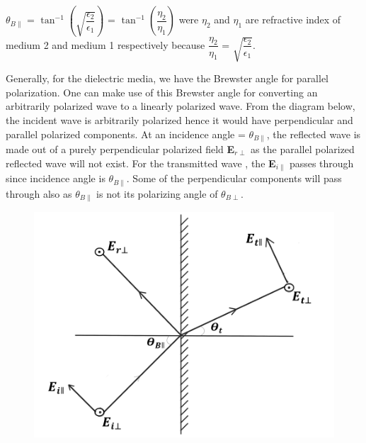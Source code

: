  $\theta_{B\parallel}$ = $\tan^{-1}\left(\sqrt{\dfrac{\epsilon_2}{\epsilon_1}}\right)$ = $\tan^{-1}\left(\dfrac{\eta_2}{\eta_1}\right)$ were $\eta_2$ and $\eta_1$ are refractive index of medium 2 and medium 1 respectively because $\dfrac{\eta_2}{\eta_1}$ = $\sqrt{\dfrac{\epsilon_2}{\epsilon_1}}$.

Generally, for the dielectric media, we have the Brewster angle for parallel polarization. One can make use of this Brewster angle for converting an arbitrarily polarized wave to a linearly polarized wave. From the diagram below, the incident wave is arbitrarily polarized hence it would have perpendicular and parallel polarized components. At an incidence angle = $\theta_{B\parallel}$, the reflected wave is made out of a purely perpendicular polarized field \textbf{E}$_{r\perp}$ as the parallel polarized reflected wave will not exist. For the transmitted wave , the \textbf{E}$_{i\parallel}$ passes through since incidence angle is $\theta_{B\parallel}$. Some of the perpendicular components will pass through also as $\theta_{B\parallel}$ is not its polarizing angle of $\theta_{B\perp}$.

\begin{figure}[h]
	\centering
	\includegraphics[width=1\linewidth]{./graphics/No_parallel_reflected_wave}
	\caption{}
	\label{}
\end{figure}

